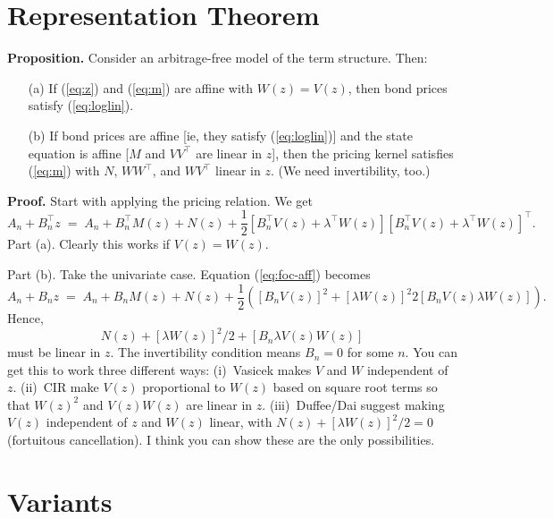 \section*{Representation Theorem}

{\bf Proposition. }
Consider an arbitrage-free model of the term structure.
Then:
\begin{enumerate}
\item[(a)] If (\ref{eq:z}) and (\ref{eq:m}) are affine with $W(z) = V(z)$,
        then bond prices satisfy (\ref{eq:loglin}).
\item[(b)] If bond prices are affine [ie, they satisfy (\ref{eq:loglin})]
        and the state equation is affine [$M$ and $VV^\top$ are linear in $z$],
        then the pricing kernel satisfies (\ref{eq:m}) with
        $N$, $WW^\top$, and $WV^\top$ linear in $z$.
        (We need invertibility, too.)
\end{enumerate}

{\bf Proof. }
Start with applying the pricing relation.
We get
\begin{equation}
        A_n + B_n^\top z \;=\;
                A_n + B_n^\top M(z) + N(z)
                + \frac{1}{2}
                  \left[ B_n^\top V(z) + \lambda^\top W(z) \right]
                  \left[ B_n^\top V(z) + \lambda^\top W(z) \right]^\top .
        \label{eq:foc-aff}
\end{equation}
Part (a). Clearly this works if $ V(z) = W(z) $.

Part (b).
Take the univariate case.
Equation (\ref{eq:foc-aff}) becomes
\[
        A_n + B_n z \;=\;
                A_n + B_n M(z) + N(z)
                + \frac{1}{2} \left(
                   [B_n V(z)]^2 + [\lambda W(z)]^2
                  2[B_n V(z) \lambda W(z)]   \right) .
\]
Hence,
\[
              N(z)  + [\lambda W(z)]^2/2 +  [B_n \lambda V(z) W(z)]
\]
must be linear in $z$.
The invertibility condition means $B_n = 0 $ for some $n$.
You can get this to work three different ways:
(i)~Vasicek makes $V$ and $W$ independent of $z$.
(ii)~CIR make $V(z)$ proportional to $W(z)$ based on square root terms so that
$W(z)^2$ and $V(z)W(z)$ are linear in $z$.
(iii)~Duffee/Dai suggest making $V(z)$ independent of $z$
and $W(z)$ linear,
with $N(z) + [\lambda W(z)]^2/2 = 0 $ (fortuitous cancellation).
I think you can show these are the only possibilities.


\section*{Variants}


